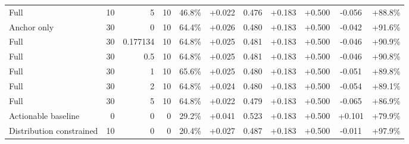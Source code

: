 \begin{table}[htbp]
\begin{tabular}{lrrrccccccc}
Full & 10 & 5 & 10 & 46.8\% & +0.022 & 0.476 & +0.183 & +0.500 & -0.056 & +88.8\% \\
Anchor only & 30 & 0 & 10 & 64.4\% & +0.026 & 0.480 & +0.183 & +0.500 & -0.042 & +91.6\% \\
Full & 30 & 0.177134 & 10 & 64.8\% & +0.025 & 0.481 & +0.183 & +0.500 & -0.046 & +90.9\% \\
Full & 30 & 0.5 & 10 & 64.8\% & +0.025 & 0.481 & +0.183 & +0.500 & -0.046 & +90.8\% \\
Full & 30 & 1 & 10 & 65.6\% & +0.025 & 0.480 & +0.183 & +0.500 & -0.051 & +89.8\% \\
Full & 30 & 2 & 10 & 64.8\% & +0.024 & 0.480 & +0.183 & +0.500 & -0.054 & +89.1\% \\
Full & 30 & 5 & 10 & 64.8\% & +0.022 & 0.479 & +0.183 & +0.500 & -0.065 & +86.9\% \\
Actionable baseline & 0 & 0 & 0 & 29.2\% & +0.041 & 0.523 & +0.183 & +0.500 & +0.101 & +79.9\% \\
Distribution constrained & 10 & 0 & 0 & 20.4\% & +0.027 & 0.487 & +0.183 & +0.500 & -0.011 & +97.9\% \\
\bottomrule
\end{tabular}
\end{table}
